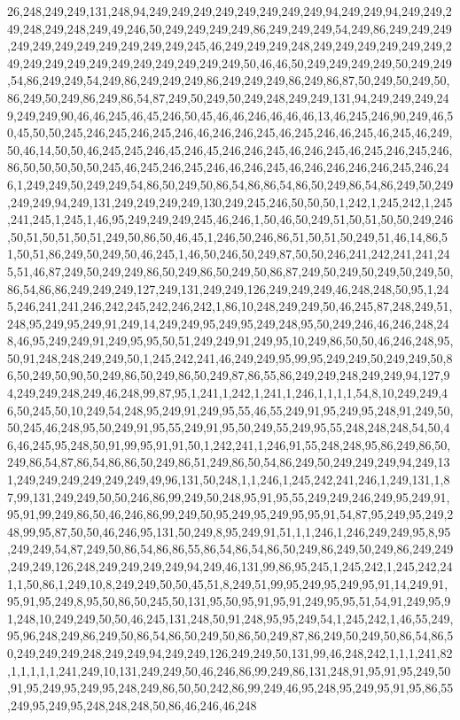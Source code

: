 26,248,249,249,131,248,94,249,249,249,249,249,249,249,249,94,249,249,94,249,249,249,248,249,248,249,49,246,50,249,249,249,249,86,249,249,249,54,249,86,249,249,249,249,249,249,249,249,249,249,249,245,46,249,249,249,248,249,249,249,249,249,249,249,249,249,249,249,249,249,249,249,249,249,50,46,46,50,249,249,249,249,50,249,249,54,86,249,249,54,249,86,249,249,249,86,249,249,249,86,249,86,87,50,249,50,249,50,86,249,50,249,86,249,86,54,87,249,50,249,50,249,248,249,249,131,94,249,249,249,249,249,249,90,46,46,245,46,45,246,50,45,46,46,246,46,46,46,13,46,245,246,90,249,46,50,45,50,50,245,246,245,246,245,246,46,246,246,245,46,245,246,46,245,46,245,46,249,50,46,14,50,50,46,245,245,246,45,246,45,246,246,245,46,246,245,46,245,246,245,246,86,50,50,50,50,50,245,46,245,246,245,246,46,246,245,46,246,246,246,246,245,246,246,1,249,249,50,249,249,54,86,50,249,50,86,54,86,86,54,86,50,249,86,54,86,249,50,249,249,249,94,249,131,249,249,249,249,130,249,245,246,50,50,50,1,242,1,245,242,1,245,241,245,1,245,1,46,95,249,249,249,245,46,246,1,50,46,50,249,51,50,51,50,50,249,246,50,51,50,51,50,51,249,50,86,50,46,45,1,246,50,246,86,51,50,51,50,249,51,46,14,86,51,50,51,86,249,50,249,50,46,245,1,46,50,246,50,249,87,50,50,246,241,242,241,241,245,51,46,87,249,50,249,249,86,50,249,86,50,249,50,86,87,249,50,249,50,249,50,249,50,86,54,86,86,249,249,249,127,249,131,249,249,126,249,249,249,46,248,248,50,95,1,245,246,241,241,246,242,245,242,246,242,1,86,10,248,249,249,50,46,245,87,248,249,51,248,95,249,95,249,91,249,14,249,249,95,249,95,249,248,95,50,249,246,46,246,248,248,46,95,249,249,91,249,95,95,50,51,249,249,91,249,95,10,249,86,50,50,46,246,248,95,50,91,248,248,249,249,50,1,245,242,241,46,249,249,95,99,95,249,249,50,249,249,50,86,50,249,50,90,50,249,86,50,249,86,50,249,87,86,55,86,249,249,248,249,249,94,127,94,249,249,248,249,46,248,99,87,95,1,241,1,242,1,241,1,246,1,1,1,1,54,8,10,249,249,46,50,245,50,10,249,54,248,95,249,91,249,95,55,46,55,249,91,95,249,95,248,91,249,50,50,245,46,248,95,50,249,91,95,55,249,91,95,50,249,55,249,95,55,248,248,248,54,50,46,46,245,95,248,50,91,99,95,91,91,50,1,242,241,1,246,91,55,248,248,95,86,249,86,50,249,86,54,87,86,54,86,86,50,249,86,51,249,86,50,54,86,249,50,249,249,249,94,249,131,249,249,249,249,249,249,49,96,131,50,248,1,1,246,1,245,242,241,246,1,249,131,1,87,99,131,249,249,50,50,246,86,99,249,50,248,95,91,95,55,249,249,246,249,95,249,91,95,91,99,249,86,50,46,246,86,99,249,50,95,249,95,249,95,95,91,54,87,95,249,95,249,248,99,95,87,50,50,46,246,95,131,50,249,8,95,249,91,51,1,1,246,1,246,249,249,95,8,95,249,249,54,87,249,50,86,54,86,86,55,86,54,86,54,86,50,249,86,249,50,249,86,249,249,249,249,126,248,249,249,249,249,94,249,46,131,99,86,95,245,1,245,242,1,245,242,241,1,50,86,1,249,10,8,249,249,50,50,45,51,8,249,51,99,95,249,95,249,95,91,14,249,91,95,91,95,249,8,95,50,86,50,245,50,131,95,50,95,91,95,91,249,95,95,51,54,91,249,95,91,248,10,249,249,50,50,46,245,131,248,50,91,248,95,95,249,54,1,245,242,1,46,55,249,95,96,248,249,86,249,50,86,54,86,50,249,50,86,50,249,87,86,249,50,249,50,86,54,86,50,249,249,249,248,249,249,94,249,249,126,249,249,50,131,99,46,248,242,1,1,1,241,82,1,1,1,1,1,241,249,10,131,249,249,50,46,246,86,99,249,86,131,248,91,95,91,95,249,50,91,95,249,95,249,95,248,249,86,50,50,242,86,99,249,46,95,248,95,249,95,91,95,86,55,249,95,249,95,248,248,248,50,86,46,246,46,248